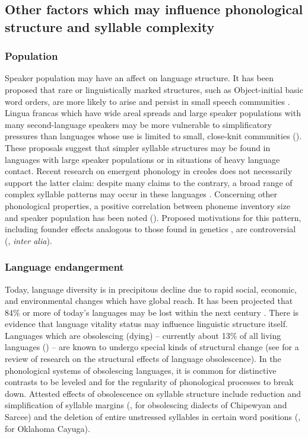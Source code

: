 \subsection{Other factors which may influence phonological structure and syllable complexity}\label{sec:2.1.2}
\subsubsection{{Population}}\label{sec:2.1.2.1}

  Speaker population may have an affect on language structure. It has been proposed that rare or linguistically marked structures, such as Object-initial basic word orders, are more likely to arise and persist in small speech communities \citep{Nettle1999a}. Lingua francas which have wide areal spreads and large speaker populations with many second-language speakers may be more vulnerable to simplificatory pressures than languages whose use is limited to small, close-knit communities (\citealt{Nettle1999b,LupyanDale2010}). These proposals suggest that simpler syllable structures may be found in languages with large speaker populations or in situations of heavy language contact. Recent research on emergent phonology in creoles does not necessarily support the latter claim: despite many claims to the contrary, a broad range of complex syllable patterns may occur in these languages \citep{Schramm2014}. Concerning other phonological properties, a positive correlation between phoneme inventory size and speaker population has been noted (\citealt{HayBauer2007}). Proposed motivations for this pattern, including founder effects analogous to those found in genetics \citep{Atkinson2011}, are controversial (\citealt{Bybee2011,MaddiesonEtAl2011,HunleyEtAl2012}, \textit{inter alia}).

\subsubsection{{Language} {endangerment}}\label{sec:2.1.2.2}

  Today, language diversity is in precipitous decline due to rapid social, economic, and environmental changes which have global reach. It has been projected that 84\% or more of today’s languages may be lost within the next century \citep[113--114]{Nettle1999b}. There is evidence that language vitality status may influence linguistic structure itself. Languages which are obsolescing (dying) -- currently about 13\% of all living languages (\citealt{SimonsFennig2018}) -- are known to undergo special kinds of structural change (see \citealt{Romaine2010} for a review of research on the structural effects of language obsolescence). In the phonological systems of obsolescing languages, it is common for distinctive contrasts to be leveled and for the regularity of phonological processes to break down. Attested effects of obsolescence on syllable structure include reduction and simplification of syllable margins (\citealt{Cook1989}, for obsolescing dialects of Chipewyan and Sarcee) and the deletion of entire unstressed syllables in certain word positions (\citealt{Mithun1989}, for Oklahoma Cayuga).

